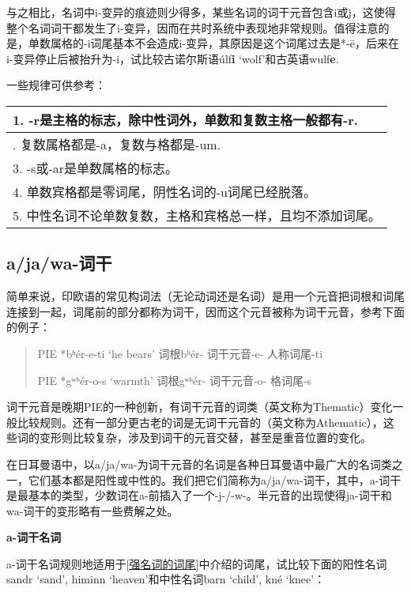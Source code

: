 与之相比，名词中i-变异的痕迹则少得多，某些名词的词干元音包含i或j，这使得整个名词词干都发生了i-变异，因而在共时系统中表现地非常规则。值得注意的是，单数属格的-i词尾基本不会造成i-变异，其原因是这个词尾过去是*-ē，后来在i-变异停止后被抬升为-i，试比较古诺尔斯语úlf\textbf{i}
`wolf'和古英语wulf\textbf{e}.

一些规律可供参考：

\begin{longtable}{l}
  \toprule
  1. -r是主格的标志，除中性词外，单数和复数主格一般都有-r. \\
  \midrule
  \endhead
  \bottomrule
  \endfoot
  2. 复数属格都是-a，复数与格都是-um.           \\
  3. -s或-ar是单数属格的标志。               \\
  4. 单数宾格都是零词尾，阴性名词的-u词尾已经脱落。      \\
  5. 中性名词不论单数复数，主格和宾格总一样，且均不添加词尾。  \\
\end{longtable}

\subsection{a/ja/wa-词干}\label{a/ja/wa-词干}

简单来说，印欧语的常见构词法（无论动词还是名词）是用一个元音把词根和词尾连接到一起，词尾前的部分都称为词干，因而这个元音被称为词干元音，参考下面的例子：

\begin{quote}
  PIE *bʰér-e-ti `he bears' 词根bʰér- 词干元音-e- 人称词尾-ti

  PIE *gʷʰér-o-s `warmth' 词根gʷʰér- 词干元音-o- 格词尾-s
\end{quote}

词干元音是晚期PIE的一种创新，有词干元音的词类（英文称为Thematic）变化一般比较规则。还有一部分更古老的词是无词干元音的（英文称为Athematic），这些词的变形则比较复杂，涉及到词干的元音交替，甚至是重音位置的变化。

在日耳曼语中，以a/ja/wa-为词干元音的名词是各种日耳曼语中最广大的名词类之一，它们基本都是阳性或中性的。我们把它们简称为a/ja/wa-词干，其中，a-词干是最基本的类型，少数词在a-前插入了一个-j-/-w-。半元音的出现使得ja-词干和wa-词干的变形略有一些费解之处。

\textbf{a-词干名词}

a-词干名词规则地适用于\ref{强名词的词尾}中介绍的词尾，试比较下面的阳性名词sandr
`sand', himinn `heaven'和中性名词barn `child', kné `knee'：

